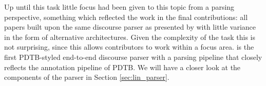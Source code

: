 Up until this task little focus had been given to this topic from a parsing perspective, something which reflected the work in the final contributions: all papers built upon the same discourse parser as presented by \citep{lin_pdtbstyled_2014} with little variance in the form of alternative architectures. Given the complexity of the task this is not surprising, since this allows contributors to work within a focus area. \citep{lin_pdtbstyled_2014} is the first PDTB-styled end-to-end discourse parser with a parsing pipeline that closely reflects the annotation pipeline of PDTB. We will have a closer look at the components of the parser in Section \ref{sec:lin_parser}.

